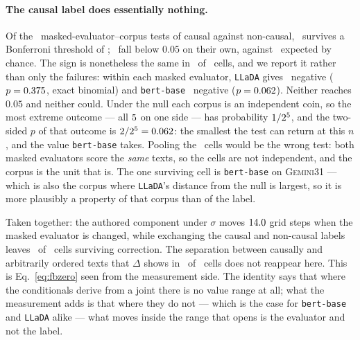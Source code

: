 \paragraph{The causal label does essentially nothing.}
Of the \FbNTestsCausal\ masked-evaluator--corpus tests of causal against non-causal,
\FbNSurviving\ survives a Bonferroni threshold of \FbBonferroni;
\FbNNominal\ fall below $0.05$ on their own, against \FbNExpected\ expected
by chance.  The sign is nonetheless the same in \FbNNegative\ of
\FbNCells\ cells, and we report it rather than only the failures: within
each masked evaluator, \texttt{LLaDA} gives \FbSignNegLLaDA\ negative ($p =
0.375$, exact binomial) and \texttt{bert-base}
\FbSignNegBertBase\ negative ($p = 0.062$).  Neither reaches
$0.05$ and neither could.  Under the null each corpus is an independent coin,
so the most extreme outcome --- all $5$ on one side --- has
probability $1/2^{5}$, and the two-sided $p$ of that
outcome is $2/2^{5} = 0.062$: the smallest the
test can return at this $n$, and the value \texttt{bert-base} takes.  Pooling the
\FbNCells\ cells would be the wrong test: both masked evaluators score the
\emph{same} texts, so the cells are not independent, and the corpus is the
unit that is.  The one surviving cell is \texttt{bert-base} on
\textsc{Gemini31} --- which is also the corpus where \texttt{LLaDA}'s distance from the null is largest, so it is more plausibly a property of
that corpus than of the label.

Taken together: the authored component under $\sigma$ moves
$14.0$ grid steps when the masked evaluator is changed, while
exchanging the causal and non-causal labels leaves \FbNSurviving\ of
\FbNCells\ cells surviving correction.  The separation between causally and
arbitrarily ordered texts that $\Delta$ shows in \ContrastNRejecting\ of
\ContrastNCells\ cells does not reappear here.  This is
Eq.~\eqref{eq:fbzero} seen from the measurement side.  The identity says
that where the conditionals derive from a joint there is no value range at
all; what the measurement adds is that where they do not --- which is the
case for \texttt{bert-base} and \texttt{LLaDA} alike --- what moves inside
the range that opens is the evaluator and not the label.

